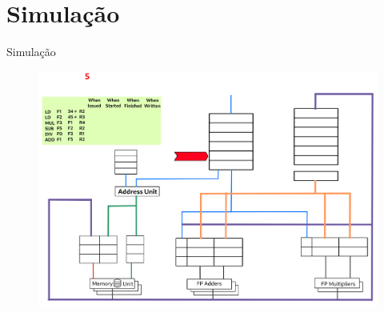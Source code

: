 \section{Simulação}

\begin{frame}{Simulação}

  \begin{figure}[ht]
    \centering
    \includegraphics[scale=0.3]{Arquitetura3.png}
  \end{figure}

\end{frame}